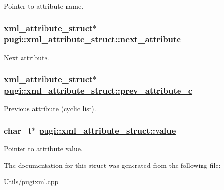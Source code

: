 Pointer to attribute name. 

\hypertarget{structpugi_1_1xml__attribute__struct_9860c0eb7fa72dc9b69ee9b0575f9efc}{
\subsubsection[next\_\-attribute]{\setlength{\rightskip}{0pt plus 5cm}\hyperlink{structpugi_1_1xml__attribute__struct}{xml\_\-attribute\_\-struct}$\ast$ \hyperlink{structpugi_1_1xml__attribute__struct_9860c0eb7fa72dc9b69ee9b0575f9efc}{pugi::xml\_\-attribute\_\-struct::next\_\-attribute}}}
\label{structpugi_1_1xml__attribute__struct_9860c0eb7fa72dc9b69ee9b0575f9efc}


Next attribute. 

\hypertarget{structpugi_1_1xml__attribute__struct_0e3a022235b316e4cfc1034ceb7d7862}{
\subsubsection[prev\_\-attribute\_\-c]{\setlength{\rightskip}{0pt plus 5cm}\hyperlink{structpugi_1_1xml__attribute__struct}{xml\_\-attribute\_\-struct}$\ast$ \hyperlink{structpugi_1_1xml__attribute__struct_0e3a022235b316e4cfc1034ceb7d7862}{pugi::xml\_\-attribute\_\-struct::prev\_\-attribute\_\-c}}}
\label{structpugi_1_1xml__attribute__struct_0e3a022235b316e4cfc1034ceb7d7862}


Previous attribute (cyclic list). 

\hypertarget{structpugi_1_1xml__attribute__struct_e652627d56cb9dcc0afdd1fbf6570364}{
\subsubsection[value]{\setlength{\rightskip}{0pt plus 5cm}char\_\-t$\ast$ \hyperlink{structpugi_1_1xml__attribute__struct_e652627d56cb9dcc0afdd1fbf6570364}{pugi::xml\_\-attribute\_\-struct::value}}}
\label{structpugi_1_1xml__attribute__struct_e652627d56cb9dcc0afdd1fbf6570364}


Pointer to attribute value. 



The documentation for this struct was generated from the following file:\begin{CompactItemize}
\item 
Utils/\hyperlink{pugixml_8cpp}{pugixml.cpp}\end{CompactItemize}
